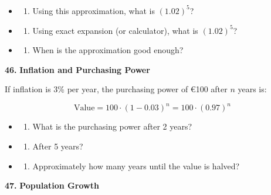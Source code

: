 \documentclass[
  11pt,
]{article}
\providecommand{\tightlist}{%
  \setlength{\itemsep}{0pt}\setlength{\parskip}{0pt}}
\begin{document}
\begin{itemize}
\item
  \begin{enumerate}
  \def\labelenumi{(\alph{enumi})}
  \tightlist
  \item
    Using this approximation, what is \((1.02)^5\)?
  \end{enumerate}
\item
  \begin{enumerate}
  \def\labelenumi{(\alph{enumi})}
  \setcounter{enumi}{1}
  \tightlist
  \item
    Using exact expansion (or calculator), what is \((1.02)^5\)?
  \end{enumerate}
\item
  \begin{enumerate}
  \def\labelenumi{(\alph{enumi})}
  \setcounter{enumi}{2}
  \tightlist
  \item
    When is the approximation good enough?
  \end{enumerate}
\end{itemize}

\textbf{46.} \textbf{Inflation and Purchasing Power}

If inflation is 3\% per year, the purchasing power of €100 after \(n\)
years is:

\[\text{Value} = 100 \cdot (1 - 0.03)^n = 100 \cdot (0.97)^n\]

\begin{itemize}
\item
  \begin{enumerate}
  \def\labelenumi{(\alph{enumi})}
  \tightlist
  \item
    What is the purchasing power after 2 years?
  \end{enumerate}
\item
  \begin{enumerate}
  \def\labelenumi{(\alph{enumi})}
  \setcounter{enumi}{1}
  \tightlist
  \item
    After 5 years?
  \end{enumerate}
\item
  \begin{enumerate}
  \def\labelenumi{(\alph{enumi})}
  \setcounter{enumi}{2}
  \tightlist
  \item
    Approximately how many years until the value is halved?
  \end{enumerate}
\end{itemize}

\textbf{47.} \textbf{Population Growth}
\end{document}
